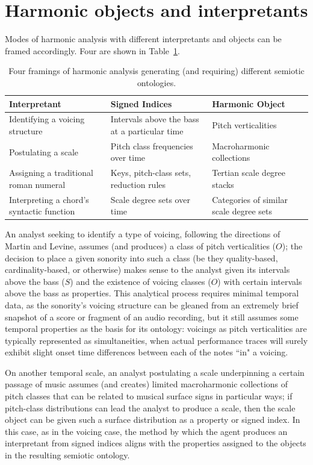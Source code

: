 \section{Harmonic objects and interpretants}
Modes of harmonic analysis with different interpretants and objects can be framed accordingly.  Four are shown in Table~\ref{frames}.
\begin{table}[h]
  \caption{Four framings of harmonic analysis generating (and requiring) different semiotic ontologies.}
  \centering
\begin{tabular}{p{1.75in} |p{2in} | p{2in}}
\hline\hline
Interpretant & Signed Indices & Harmonic Object \\ [0.5ex]
\hline
Identifying a voicing structure & Intervals above the bass at a particular time & Pitch verticalities \\
Postulating a scale & Pitch class frequencies over time & Macroharmonic collections \\
Assigning a traditional roman numeral & Keys, pitch-class sets, reduction rules & Tertian scale degree stacks \\
Interpreting a chord's syntactic function & Scale degree sets over time & Categories of similar scale degree sets \\[1ex]
\hline
\end{tabular}
\label{frames}
\end{table}
An analyst seeking to identify a type of voicing, following the directions of Martin and Levine, assumes (and produces) a class of pitch verticalities ($O$); the decision to place a given sonority into such a class (be they quality-based, cardinality-based, or otherwise) makes sense to the analyst given its intervals above the bass ($S$) and the existence of voicing classes ($O$) with certain intervals above the bass as properties.  This analytical process requires minimal temporal data, as the sonority's voicing structure can be gleaned from an extremely brief snapshot of a score or fragment of an audio recording, but it still assumes some temporal properties as the basis for its ontology: voicings as pitch verticalities are typically represented as simultaneities, when actual performance traces will surely exhibit slight onset time differences between each of the notes ``in" a voicing.

On another temporal scale, an analyst postulating a scale underpinning a certain passage of music assumes (and creates) limited macroharmonic collections of pitch classes that can be related to musical surface signs in particular ways; if pitch-class distributions can lead the analyst to produce a scale, then the scale object can be given such a surface distribution as a property or signed index.  In this case, as in the voicing case, the method by which the agent produces an interpretant from signed indices aligns with the properties assigned to the objects in the resulting semiotic ontology.

